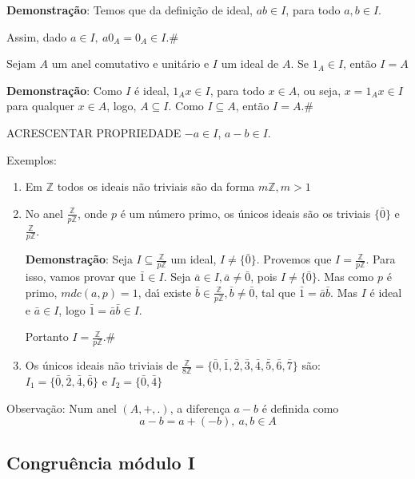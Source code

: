 \textbf{Demonstra{\c c}{\~a}o}: Temos que da defini{\c c}{\~a}o de ideal, $ab\in I$, para todo $a,b\in I$.

Assim, dado $a\in I,\ a0_{A}=0_{A}\in I$.\#

\begin{proposicao} Sejam $A$ um anel comutativo e unit{\'a}rio e $I$ um ideal de $A$. Se $1_{A}\in I$, ent{\~a}o $I=A$\end{proposicao}

\textbf{Demonstra{\c c}{\~a}o}: Como $I$ {\'e} ideal, $1_{A}x\in I$, para todo $x\in A$, ou seja, $x=1_{A}x\in I$ para qualquer $x\in A$, logo, $A\subseteq I$. Como $I\subseteq A$, ent{\~a}o $I=A$.\#

ACRESCENTAR PROPRIEDADE $-a \in I$, $a-b \in I$.

Exemplos:
\begin{enumerate}
\item Em $\mathbb{Z}$ todos os ideais n{\~a}o triviais s{\~a}o da forma $m\mathbb{Z},m>1$
\item No anel $\displaystyle\frac{\mathbb{Z}}{p\mathbb{Z}}$, onde $p$ {\'e} um n{\'u}mero primo, os {\'u}nicos ideais  s{\~a}o os triviais $\{\bar{0}\}$ e $\displaystyle\frac{\mathbb{Z}}{p\mathbb{Z}}$.

\textbf{Demonstra{\c c}{\~a}o}: Seja $I\subseteq\displaystyle\frac{\mathbb{Z}}{p\mathbb{Z}}$ um ideal, $I\neq\{\bar{0}\}$. Provemos que 
$I=\displaystyle\frac{\mathbb{Z}}{p\mathbb{Z}}$. Para isso, vamos provar que $\bar{1}\in I$. Seja $\bar{a}\in I, \bar{a}\neq \bar{0}$, pois $I\neq\{\bar{0}\}$. Mas como $p$ {\'e} primo, $mdc(a,p)=1$, da{\'\i} existe $\bar{b}\in\displaystyle\frac{\mathbb{Z}}{p\mathbb{Z}},\bar{b}\neq\bar{0}$, tal que $\bar{1}=\bar{a}\bar{b}$. Mas $I$ {\'e} ideal e $\bar{a}\in I$, logo $\bar{1}=\bar{a}\bar{b}\in I$.

Portanto $I=\displaystyle\frac{\mathbb{Z}}{p\mathbb{Z}}$.\#
\item Os {\'u}nicos ideais n{\~a}o triviais de $\displaystyle\frac{\mathbb{Z}}{8\mathbb{Z}}=\{\bar{0},\bar{1},\bar{2},\bar{3},\bar{4},\bar{5},\bar{6},\bar{7}\}$ s{\~a}o:\\
$I_{1}=\{\bar{0},\bar{2},\bar{4},\bar{6}\}$ e $I_{2}=\{\bar{0},\bar{4}\}$ 

\end{enumerate}

Observa{\c c}{\~a}o: Num anel $(A,+,.)$, a diferen{\c c}a $a-b$ {\'e} definida como
\[a-b=a+(-b),\ a,b\in A\]

\subsection{Congru{\^e}ncia m{\'o}dulo I}
